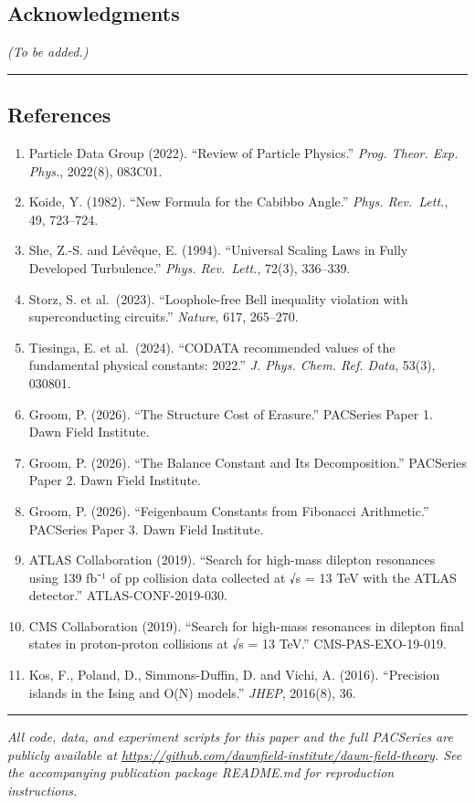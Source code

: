 \documentclass[
  11pt,
  a4paper]{article}
\providecommand{\tightlist}{%
  \setlength{\itemsep}{0pt}\setlength{\parskip}{0pt}}
\begin{document}
\subsection{Acknowledgments}\label{acknowledgments}

\emph{(To be added.)}

\begin{center}\rule{0.5\linewidth}{0.5pt}\end{center}

\subsection{References}\label{references}

\begin{enumerate}
\def\labelenumi{\arabic{enumi}.}
\tightlist
\item
  Particle Data Group (2022). ``Review of Particle Physics.''
  \emph{Prog. Theor. Exp. Phys.}, 2022(8), 083C01.
\item
  Koide, Y. (1982). ``New Formula for the Cabibbo Angle.'' \emph{Phys.
  Rev.~Lett.}, 49, 723--724.
\item
  She, Z.-S. and Lévêque, E. (1994). ``Universal Scaling Laws in Fully
  Developed Turbulence.'' \emph{Phys. Rev.~Lett.}, 72(3), 336--339.
\item
  Storz, S. et al.~(2023). ``Loophole-free Bell inequality violation
  with superconducting circuits.'' \emph{Nature}, 617, 265--270.
\item
  Tiesinga, E. et al.~(2024). ``CODATA recommended values of the
  fundamental physical constants: 2022.'' \emph{J. Phys. Chem. Ref.
  Data}, 53(3), 030801.
\item
  Groom, P. (2026). ``The Structure Cost of Erasure.'' PACSeries Paper
  1. Dawn Field Institute.
\item
  Groom, P. (2026). ``The Balance Constant and Its Decomposition.''
  PACSeries Paper 2. Dawn Field Institute.
\item
  Groom, P. (2026). ``Feigenbaum Constants from Fibonacci Arithmetic.''
  PACSeries Paper 3. Dawn Field Institute.
\item
  ATLAS Collaboration (2019). ``Search for high-mass dilepton resonances
  using 139 fb⁻¹ of pp collision data collected at √s = 13 TeV with the
  ATLAS detector.'' ATLAS-CONF-2019-030.
\item
  CMS Collaboration (2019). ``Search for high-mass resonances in
  dilepton final states in proton-proton collisions at √s = 13 TeV.''
  CMS-PAS-EXO-19-019.
\item
  Kos, F., Poland, D., Simmons-Duffin, D. and Vichi, A. (2016).
  ``Precision islands in the Ising and O(N) models.'' \emph{JHEP},
  2016(8), 36.
\end{enumerate}

\begin{center}\rule{0.5\linewidth}{0.5pt}\end{center}

\emph{All code, data, and experiment scripts for this paper and the full
PACSeries are publicly available at
\url{https://github.com/dawnfield-institute/dawn-field-theory}. See the
accompanying publication package README.md for reproduction
instructions.}
\end{document}
